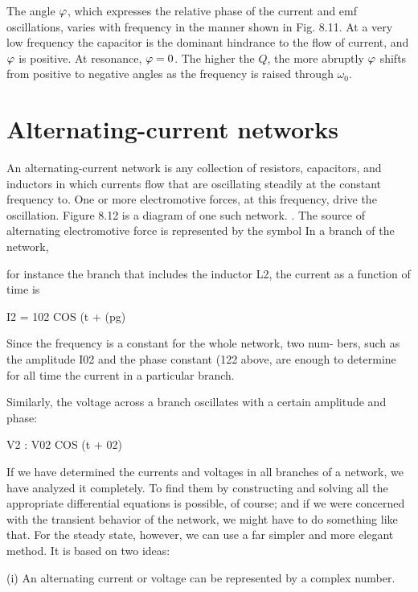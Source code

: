 The angle $\varphi$, which expresses the relative phase of the current and
emf oscillations, varies with frequency in the manner shown in
Fig. 8.11. At a very low frequency the capacitor is the dominant
hindrance to the flow of current, and $\varphi$ is positive. At resonance, $\varphi = 0$.
The higher the $Q$, the more abruptly $\varphi$ shifts from positive to negative
angles as the frequency is raised through $\omega_0$.

\iffalse

\section{Alternating-current networks}

An alternating-current network is any collection of resistors,
capacitors, and inductors in which currents flow that are oscillating
steadily at the constant frequency to. One or more electromotive
forces, at this frequency, drive the oscillation. Figure 8.12 is a diagram
of one such network. . The source of alternating electromotive
force is represented by the symbol  In a branch of the network,

for instance the branch that includes the inductor L2, the current as
a function of time is

\begin{equation}
\end{equation}
I2 = 102 COS (\omega t + (pg) 

Since the frequency is a constant for the whole network, two num-
bers, such as the amplitude I02 and the phase constant (122 above, are
enough to determine for all time the current in a particular branch.

 

Similarly, the voltage across a branch oscillates with a certain
amplitude and phase:

\begin{equation}
\end{equation}
V2 : V02 COS (\omega t + 02) 

If we have determined the currents and voltages in all branches of
a network, we have analyzed it completely. To find them by constructing
and solving all the appropriate differential equations is
possible, of course; and if we were concerned with the transient behavior
of the network, we might have to do something like that. For
the steady state, however, we can use a far simpler and more elegant
method. It is based on two ideas:

(i) An alternating current or voltage can be represented by a
complex number.

